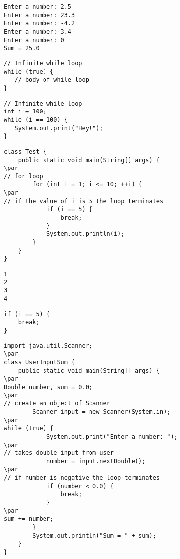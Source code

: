 \documentclass{book}
\def\lthtmlcheckvsize{\ifdim\ht\sizebox<\vsize 
  \ifdim\wd\sizebox<\hsize\expandafter\hfill\fi \expandafter\vfill
  \else\expandafter\vss\fi}%
\begin{document}
{\newpage\clearpage
{}%
\begin{lstlisting}
Enter a number: 2.5
Enter a number: 23.3
Enter a number: -4.2
Enter a number: 3.4
Enter a number: 0
Sum = 25.0
\end{lstlisting}%
\lthtmlfigureZ
\lthtmlcheckvsize\clearpage}

{\newpage\clearpage
{}%
\begin{lstlisting}
// Infinite while loop
while (true) {
   // body of while loop
}
\end{lstlisting}%
\lthtmlfigureZ
\lthtmlcheckvsize\clearpage}

{\newpage\clearpage
{}%
\begin{lstlisting}
// Infinite while loop
int i = 100;
while (i == 100) {
   System.out.print("Hey!");
}
\end{lstlisting}%
\lthtmlfigureZ
\lthtmlcheckvsize\clearpage}

{\newpage\clearpage
{}%
\begin{lstlisting}
class Test {
    public static void main(String[] args) {
\par
// for loop
        for (int i = 1; i <= 10; ++i) {
\par
// if the value of i is 5 the loop terminates  
            if (i == 5) {
                break;
            }      
            System.out.println(i);
        }   
    }
}
\end{lstlisting}%
\lthtmlfigureZ
\lthtmlcheckvsize\clearpage}

{\newpage\clearpage
{}%
\begin{lstlisting}
1
2
3
4
\end{lstlisting}%
\lthtmlfigureZ
\lthtmlcheckvsize\clearpage}

{\newpage\clearpage
{}%
\begin{lstlisting}
if (i == 5) {
    break;
}
\end{lstlisting}%
\lthtmlfigureZ
\lthtmlcheckvsize\clearpage}

{\newpage\clearpage
{}%
\begin{lstlisting}
import java.util.Scanner;
\par
class UserInputSum {
    public static void main(String[] args) {
\par
Double number, sum = 0.0;
\par
// create an object of Scanner
        Scanner input = new Scanner(System.in);
\par
while (true) {
            System.out.print("Enter a number: ");
\par
// takes double input from user
            number = input.nextDouble();
\par
// if number is negative the loop terminates
            if (number < 0.0) {
                break;
            }
\par
sum += number;
        }
        System.out.println("Sum = " + sum);
    }
}
\end{lstlisting}%
\lthtmlfigureZ
\lthtmlcheckvsize\clearpage}
\end{document}
